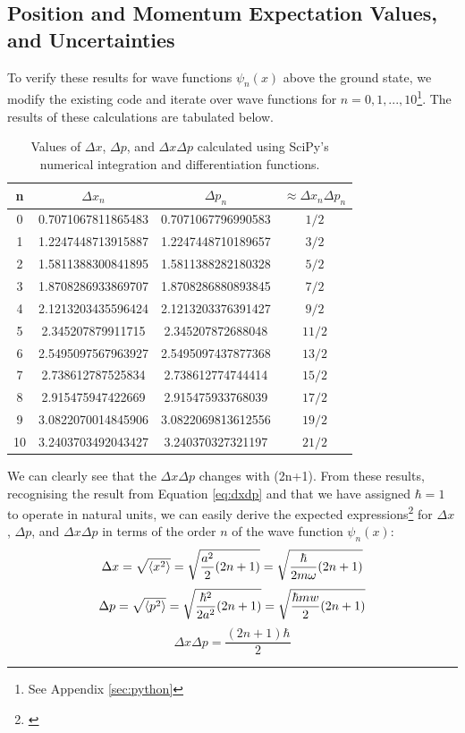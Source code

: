 \documentclass[a4paper]{article}
\begin{document}
\subsection{Position and Momentum Expectation Values, and Uncertainties}
To verify these results for wave functions $\psi_n(x)$ above the ground state, we modify the existing code and iterate over wave functions for $n=0, 1, ..., 10$\footnote{See Appendix \ref{sec:python}}. The results of these calculations are tabulated below. 
  \begin{table}[h!]
  \centering
  \begin{tabular}{cccc}
  n     & $\Delta x_n$       & $\Delta p_n$       & $\approx\Delta x_n\Delta p_n$ \\\hline
  0     & 0.7071067811865483 & 0.7071067796990583 & $1/2$ \\
  1     & 1.2247448713915887 & 1.2247448710189657 & $3/2$ \\
  2     & 1.5811388300841895 & 1.5811388282180328 & $5/2$ \\
  3     & 1.8708286933869707 & 1.8708286880893845 & $7/2$ \\
  4     & 2.1213203435596424 & 2.1213203376391427 & $9/2$ \\
  5     & 2.345207879911715  & 2.345207872688048  & $11/2$ \\
  6     & 2.5495097567963927 & 2.5495097437877368 & $13/2$ \\
  7     & 2.738612787525834  & 2.738612774744414  & $15/2$ \\
  8     & 2.915475947422669  & 2.915475933768039  & $17/2$ \\
  9     & 3.0822070014845906 & 3.0822069813612556 & $19/2$ \\
  10    & 3.2403703492043427 & 3.240370327321197  & $21/2$ 
  \end{tabular}
  \caption{\label{tab:0to10}Values of $\Delta x$, $\Delta p$, and $\Delta x\Delta p$ calculated using SciPy's numerical integration and differentiation functions.}
  \end{table}
\newpage
We can clearly see that the $\Delta x\Delta p$ changes with (2n+1).
From these results, recognising the result from Equation \ref{eq:dxdp} and that we have assigned $\hbar =1$ to operate in natural units, we can easily derive the expected expressions\footnote{\cite[\S9.2 Eq7$\sim$p.83]{pao:2012}} for $\Delta x$, $\Delta p$, and $\Delta x\Delta p$ in terms of the order $n$ of the wave function $\psi_n(x)$:
\begin{equation} \label{eq:un_x}
\Delta x=\sqrt{\expval{x^2}}=\sqrt{\frac{a^2}2(2n+1)}=\sqrt{\frac\hbar{2m\omega}(2n+1)}
\end{equation}
\begin{equation} \label{eq:un_p}
\Delta p=\sqrt{\expval{p^2}}=\sqrt{\frac{\hbar^2}{2a^2}(2n+1)}=\sqrt{\frac{\hbar mw}2(2n+1)}
\end{equation}
\begin{equation}
\Delta x\Delta p=\frac{(2n+1)\hbar}2
\end{equation}
\end{document}
